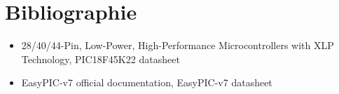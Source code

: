 \documentclass[a4paper, 12pt]{book}
\begin{document}
\chapter{Bibliographie}
\begin{itemize}
\item 28/40/44-Pin, Low-Power, High-Performance Microcontrollers with XLP Technology, PIC18F45K22 datasheet
\item EasyPIC-v7 official documentation, EasyPIC-v7 datasheet
\end{itemize}



\end{document}
